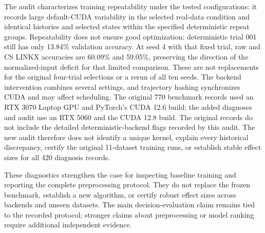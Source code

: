 The audit characterizes training repeatability under the tested configurations: it records large default-CUDA variability in the selected real-data condition and identical histories and selected states within the specified deterministic repeat groups. Repeatability does not ensure good optimization: deterministic trial 001 still has only 13.84\% validation accuracy. At seed 4 with that fixed trial, raw and CS LINKX accuracies are 60.09\% and 59.05\%, preserving the direction of the normalized-input deficit for that limited comparison. These are not replacements for the original four-trial selections or a rerun of all ten seeds. The backend intervention combines several settings, and trajectory hashing synchronizes CUDA and may affect scheduling. The original 770 benchmark records used an RTX 3070 Laptop GPU and PyTorch's CUDA 12.6 build; the added diagnoses and audit use an RTX 5060 and the CUDA 12.8 build. The original records do not include the detailed deterministic-backend flags recorded by this audit. The new audit therefore does not identify a unique kernel, explain every historical discrepancy, certify the original 11-dataset training runs, or establish stable effect sizes for all 420 diagnosis records.

These diagnostics strengthen the case for inspecting baseline training and reporting the complete preprocessing protocol. They do not replace the frozen benchmark, establish a new algorithm, or certify robust effect sizes across backends and unseen datasets. The main decision-evaluation claim remains tied to the recorded protocol; stronger claims about preprocessing or model ranking require additional independent evidence.
